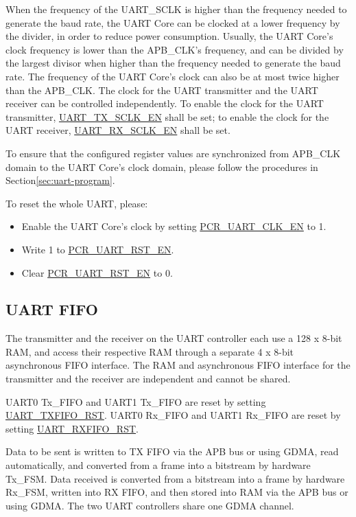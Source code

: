 \documentclass[main\_\_EN.tex]{subfiles}
\begin{document}
When the frequency of the UART\_SCLK is higher than the frequency needed to generate the baud rate, the UART Core can be clocked at a lower frequency by the divider, in order to reduce power consumption. Usually, the UART Core's clock frequency is lower than the APB\_CLK's frequency, and can be divided by the largest divisor when higher than the frequency needed to generate the baud rate. The frequency of the UART Core's clock can also be at most twice higher than the APB\_CLK. The clock for the UART transmitter and the UART receiver can be controlled independently. To enable the clock for the UART transmitter, \hyperref[fielddesc:UARTTXSCLKEN]{UART\_TX\_SCLK\_EN} shall be set; to enable the clock for the UART receiver, \hyperref[fielddesc:UARTRXSCLKEN]{UART\_RX\_SCLK\_EN} shall be set.


To ensure that the configured register values are synchronized from APB\_CLK domain to the UART Core's clock domain, please follow the procedures in Section\ref{sec:uart-program}.


To reset the whole UART, please:
\begin{itemize}
    \item Enable the UART Core's clock by setting \hyperref[fielddesc:PCRUART0CLKEN]{PCR\_UART\_CLK\_EN} to 1.
    \item Write 1 to \hyperref[fielddesc:PCRUART0RSTEN]{PCR\_UART\_RST\_EN}.
    \item Clear \hyperref[fielddesc:PCRUART0RSTEN]{PCR\_UART\_RST\_EN} to 0.

\end{itemize}


\subsection{UART FIFO}

The transmitter and the receiver on the UART controller each use a 128 x 8-bit RAM, and access their respective RAM through a separate 4 x 8-bit asynchronous FIFO interface. The RAM and asynchronous FIFO interface for the transmitter and the receiver are independent and cannot be shared.

UART0 Tx\_FIFO and UART1 Tx\_FIFO are reset by setting \hyperref[fielddesc:UARTTXFIFORST]{UART\_TXFIFO\_RST}. UART0 Rx\_FIFO and UART1 Rx\_FIFO are reset by setting \hyperref[fielddesc:UARTRXFIFORST]{UART\_RXFIFO\_RST}.

Data to be sent is written to TX FIFO via the APB bus or using GDMA, read automatically, and converted from a frame into a bitstream by hardware Tx\_FSM. Data received is converted from a bitstream into a frame by hardware Rx\_FSM, written into RX FIFO, and then stored into RAM via the APB bus or using GDMA. The two UART controllers share one GDMA channel.
\end{document}
